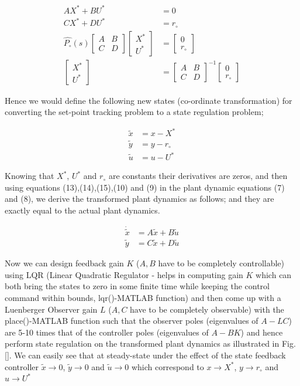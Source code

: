 \documentclass[11pt,usenames]{article}
\begin{document}
\begin{align}
AX^{*}+BU^{*}&=0 \\
CX^{*}+DU^{*}&=r_{\circ}\\\hat{P_{\circ}}(s)
\begin{bmatrix}
A & B\\
C & D
\end{bmatrix} 
\begin{bmatrix}
X^{*} \\
U^{*} 
\end{bmatrix} &= 
\begin{bmatrix}
0 \\
r_{\circ}
\end{bmatrix}\\
\begin{bmatrix}
X^{*} \\
U^{*} 
\end{bmatrix} &=
\begin{bmatrix}
A & B\\
C & D
\end{bmatrix}^{-1} 
\begin{bmatrix}
0 \\
r_{\circ}
\end{bmatrix}
\end{align}

Hence we would define the following new states (co-ordinate transformation) for converting the set-point tracking problem to a state regulation problem;

\begin{align}
\tilde{x}&=x-X^{*} \\
\tilde{y}&=y-r_{\circ} \\
\tilde{u}&=u-U^{*} 
\end{align} 

Knowing that $X^{*}$, $U^{*}$ and $r_{\circ}$ are constants their derivatives are zeros, and then using equations (13),(14),(15),(10) and (9) in the plant dynamic equations (7) and (8), we derive the transformed plant dynamics as follows; and they are exactly equal to the actual plant dynamics.

\begin{align}
\dot{\tilde{x}}&=A\tilde{x}+B\tilde{u} \\
\tilde{y}&=C\tilde{x}+D\tilde{u}
\end{align}

Now we can design feedback gain $K$ ($A,B$ have to be completely controllable)  using LQR (Linear Quadratic Regulator - helps in computing gain $K$ which can both bring the states to zero in some finite time while keeping the control command within bounds, lqr()-MATLAB function) and then come up with a Luenberger Observer gain $L$ ($A,C$ have to be completely observable) with the place()-MATLAB function such that the observer poles (eigenvalues of $A-LC$) are 5-10 times that of the controller poles (eigenvalues of $A-BK$) and  hence perform state regulation on the transformed plant dynamics as illustrated in Fig.\ref{}. We can easily see that at steady-state under the effect of the state feedback controller $\tilde{x} \rightarrow 0$, $\tilde{y} \rightarrow 0$ and $\tilde{u} \rightarrow 0$ which correspond to $x \rightarrow X^{*}$, $y \rightarrow r_{\circ}$ and $u \rightarrow U^{*}$
\end{document}
